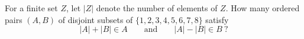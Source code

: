 For a finite set $Z$, let $|Z|$ denote the number of elements of $Z$. How many ordered pairs $(A,B)$ of disjoint subsets of $\{1,2,3,4,5,6,7,8\}$ satisfy
\[
|A|+|B|\in A\qquad\text{and}\qquad|A|-|B|\in B\ ?
\]

